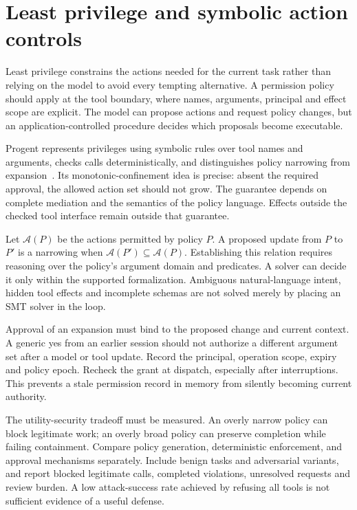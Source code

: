 \section{Least privilege and symbolic action controls}\label{sec:C28:privilege}
Least privilege constrains the actions needed for the current task rather than relying on the model to avoid every tempting alternative. A permission policy should apply at the tool boundary, where names, arguments, principal and effect scope are explicit. The model can propose actions and request policy changes, but an application-controlled procedure decides which proposals become executable.

Progent represents privileges using symbolic rules over tool names and arguments, checks calls deterministically, and distinguishes policy narrowing from expansion~\cite{corpus250411703}. Its monotonic-confinement idea is precise: absent the required approval, the allowed action set should not grow. The guarantee depends on complete mediation and the semantics of the policy language. Effects outside the checked tool interface remain outside that guarantee.

Let $\mathcal A(P)$ be the actions permitted by policy $P$. A proposed update from $P$ to $P'$ is a narrowing when $\mathcal A(P')\subseteq\mathcal A(P)$. Establishing this relation requires reasoning over the policy's argument domain and predicates. A solver can decide it only within the supported formalization. Ambiguous natural-language intent, hidden tool effects and incomplete schemas are not solved merely by placing an SMT solver in the loop.

Approval of an expansion must bind to the proposed change and current context. A generic yes from an earlier session should not authorize a different argument set after a model or tool update. Record the principal, operation scope, expiry and policy epoch. Recheck the grant at dispatch, especially after interruptions. This prevents a stale permission record in memory from silently becoming current authority.

The utility-security tradeoff must be measured. An overly narrow policy can block legitimate work; an overly broad policy can preserve completion while failing containment. Compare policy generation, deterministic enforcement, and approval mechanisms separately. Include benign tasks and adversarial variants, and report blocked legitimate calls, completed violations, unresolved requests and review burden. A low attack-success rate achieved by refusing all tools is not sufficient evidence of a useful defense.

